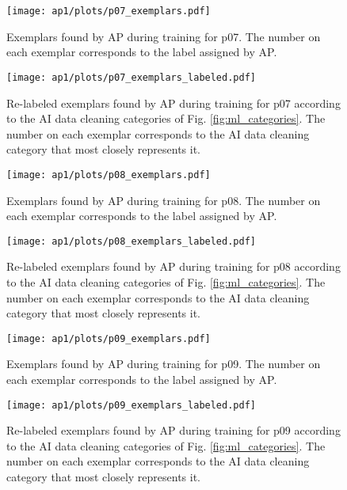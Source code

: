 \begin{figure}[hbtp]
    \centering
    \texttt{[image: ap1/plots/p07\_exemplars.pdf]}
    \caption{Exemplars found by AP during training for p07. The number on each exemplar corresponds to the label assigned by AP.}
    \label{fig:exemplars_p07_pygama}
\end{figure}
\begin{figure}[hbtp]
    \centering
    \texttt{[image: ap1/plots/p07\_exemplars\_labeled.pdf]}
    \caption{Re-labeled exemplars found by AP during training for p07 according to the AI data cleaning categories of Fig. \ref{fig:ml_categories}. The number on each exemplar corresponds to the AI data cleaning category that most closely represents it.}
    \label{fig:exemplars_p07_pygama_labeled}
\end{figure}

\begin{figure}[hbtp]
    \centering
    \texttt{[image: ap1/plots/p08\_exemplars.pdf]}
    \caption{Exemplars found by AP during training for p08. The number on each exemplar corresponds to the label assigned by AP.}
    \label{fig:exemplars_p08_pygama}
\end{figure}
\begin{figure}[hbtp]
    \centering
    \texttt{[image: ap1/plots/p08\_exemplars\_labeled.pdf]}
    \caption{Re-labeled exemplars found by AP during training for p08 according to the AI data cleaning categories of Fig. \ref{fig:ml_categories}. The number on each exemplar corresponds to the AI data cleaning category that most closely represents it.}
    \label{fig:exemplars_p08_pygama_labeled}
\end{figure}

\begin{figure}[hbtp]
    \centering
    \texttt{[image: ap1/plots/p09\_exemplars.pdf]}
    \caption{Exemplars found by AP during training for p09. The number on each exemplar corresponds to the label assigned by AP.}
    \label{fig:exemplars_p09_pygama}
\end{figure}
\begin{figure}[hbtp]
    \centering
    \texttt{[image: ap1/plots/p09\_exemplars\_labeled.pdf]}
    \caption{Re-labeled exemplars found by AP during training for p09 according to the AI data cleaning categories of Fig. \ref{fig:ml_categories}. The number on each exemplar corresponds to the AI data cleaning category that most closely represents it.}
    \label{fig:exemplars_p09_pygama_labeled}
\end{figure}